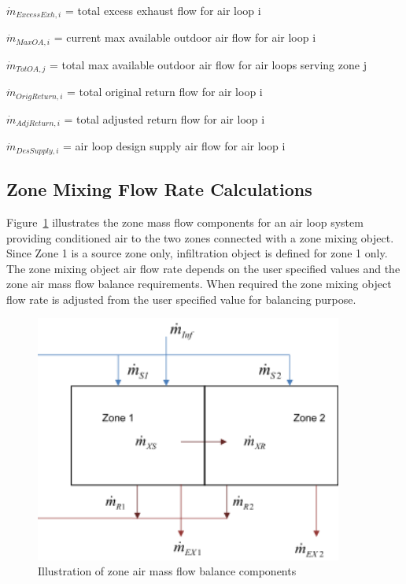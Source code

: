 \(\dot m_{ExcessExh,i}\) = total excess exhaust flow for air loop i

\(\dot m_{MaxOA,i}\) = current max available outdoor air flow for air loop i

\(\dot m_{TotOA,j}\) = total max available outdoor air flow for air loops serving zone j

\(\dot m_{OrigReturn,i}\) = total original return flow for air loop i

\(\dot m_{AdjReturn,i}\) = total adjusted return flow for air loop i

\(\dot m_{DesSupply,i}\) = air loop design supply air flow for air loop i

\subsection{Zone Mixing Flow Rate Calculations}\label{zone-mixing-flow-rate-calculations}

Figure~\ref{fig:illustration-of-zone-air-mass-flow-balance} illustrates the zone mass flow components for an air loop system providing conditioned air to the two zones connected with a zone mixing object. Since Zone 1 is a source zone only, infiltration object is defined for zone 1 only. The zone mixing object air flow rate depends on the user specified values and the zone air mass flow balance requirements. When required the zone mixing object flow rate is adjusted from the user specified value for balancing purpose.

\begin{figure}[hbtp] %
\centering
\includegraphics[width=0.9\textwidth, height=0.9\textheight, keepaspectratio=true]{media/image134.svg.png}
\caption{Illustration of zone air mass flow balance components \protect \label{fig:illustration-of-zone-air-mass-flow-balance}}
\end{figure}

